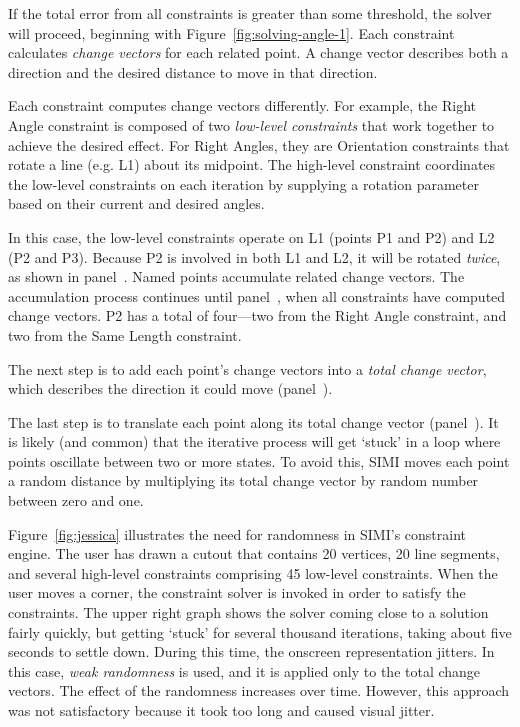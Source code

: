 

If the total error from all constraints is greater than some
threshold, the solver will proceed, beginning with
Figure~\ref{fig:solving-angle-1}. Each constraint calculates
\textit{change vectors} for each related point. A change vector
describes both a direction and the desired distance to move in that
direction. 

Each constraint computes change vectors differently. For example, the
Right Angle constraint is composed of two \textit{low-level
  constraints} that work together to achieve the desired effect. For
Right Angles, they are Orientation constraints that rotate a line
(e.g. L1) about its midpoint. The high-level constraint coordinates
the low-level constraints on each iteration by supplying a rotation
parameter based on their current and desired angles.

In this case, the low-level constraints operate on L1 (points P1 and
P2) and L2 (P2 and P3). Because P2 is involved in both L1 and L2, it
will be rotated \textit{twice}, as shown in
panel~\textit{}. Named points accumulate
related change vectors. The accumulation process continues until
panel~\textit{}, when all constraints have
computed change vectors. P2 has a total of four---two from the Right
Angle constraint, and two from the Same Length constraint.

The next step is to add each point's change vectors into a
\textit{total change vector}, which describes the direction it could
move (panel~\textit{}).

The last step is to translate each point along its total change vector
(panel~\textit{}). It is likely (and
common) that the iterative process will get `stuck' in a loop where
points oscillate between two or more states. To avoid this, SIMI moves
each point a random distance by multiplying its total change vector by
random number between zero and one.



Figure~\ref{fig:jessica} illustrates the need for randomness in SIMI's
constraint engine. The user has drawn a cutout that contains 20
vertices, 20 line segments, and several high-level constraints
comprising 45 low-level constraints. When the user moves a corner, the
constraint solver is invoked in order to satisfy the constraints. The
upper right graph shows the solver coming close to a solution fairly
quickly, but getting `stuck' for several thousand iterations, taking
about five seconds to settle down. During this time, the onscreen
representation jitters. In this case, \textit{weak randomness} is
used, and it is applied only to the total change vectors. The effect
of the randomness increases over time. However, this approach was not
satisfactory because it took too long and caused visual jitter.

